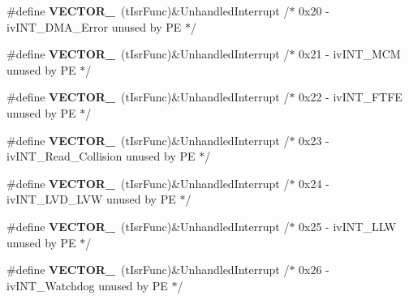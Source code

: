 \begin{DoxyCompactItemize}
\item 
\#define {\bfseries V\+E\+C\+T\+O\+R\+\_}~(t\+Isr\+Func)\&Unhandled\+Interrupt         /$\ast$ 0x20 -\/    iv\+I\+N\+T\+\_\+\+D\+M\+A\+\_\+\+Error                unused by P\+E $\ast$/\hypertarget{group___vectors___config__module_ga0269121a1928c479e78a0cf8389a8606}{}\label{group___vectors___config__module_ga0269121a1928c479e78a0cf8389a8606}

\item 
\#define {\bfseries V\+E\+C\+T\+O\+R\+\_}~(t\+Isr\+Func)\&Unhandled\+Interrupt         /$\ast$ 0x21 -\/    iv\+I\+N\+T\+\_\+\+M\+C\+M                      unused by P\+E $\ast$/\hypertarget{group___vectors___config__module_gab9aad8beb1c40b9a86b606432ae918df}{}\label{group___vectors___config__module_gab9aad8beb1c40b9a86b606432ae918df}

\item 
\#define {\bfseries V\+E\+C\+T\+O\+R\+\_}~(t\+Isr\+Func)\&Unhandled\+Interrupt         /$\ast$ 0x22 -\/    iv\+I\+N\+T\+\_\+\+F\+T\+F\+E                     unused by P\+E $\ast$/\hypertarget{group___vectors___config__module_gad92377670554ff5df8f4b91977b0b195}{}\label{group___vectors___config__module_gad92377670554ff5df8f4b91977b0b195}

\item 
\#define {\bfseries V\+E\+C\+T\+O\+R\+\_}~(t\+Isr\+Func)\&Unhandled\+Interrupt         /$\ast$ 0x23 -\/    iv\+I\+N\+T\+\_\+\+Read\+\_\+\+Collision           unused by P\+E $\ast$/\hypertarget{group___vectors___config__module_gad764304b4aca3a0d8c2d88fcb6fec003}{}\label{group___vectors___config__module_gad764304b4aca3a0d8c2d88fcb6fec003}

\item 
\#define {\bfseries V\+E\+C\+T\+O\+R\+\_}~(t\+Isr\+Func)\&Unhandled\+Interrupt         /$\ast$ 0x24 -\/    iv\+I\+N\+T\+\_\+\+L\+V\+D\+\_\+\+L\+V\+W                  unused by P\+E $\ast$/\hypertarget{group___vectors___config__module_ga136b27607e165d1c8f943c43204f548e}{}\label{group___vectors___config__module_ga136b27607e165d1c8f943c43204f548e}

\item 
\#define {\bfseries V\+E\+C\+T\+O\+R\+\_}~(t\+Isr\+Func)\&Unhandled\+Interrupt         /$\ast$ 0x25 -\/    iv\+I\+N\+T\+\_\+\+L\+L\+W                      unused by P\+E $\ast$/\hypertarget{group___vectors___config__module_ga694dcf9993014544e98daa3486a1dee8}{}\label{group___vectors___config__module_ga694dcf9993014544e98daa3486a1dee8}

\item 
\#define {\bfseries V\+E\+C\+T\+O\+R\+\_}~(t\+Isr\+Func)\&Unhandled\+Interrupt         /$\ast$ 0x26 -\/    iv\+I\+N\+T\+\_\+\+Watchdog                 unused by P\+E $\ast$/\hypertarget{group___vectors___config__module_ga6759d235ac8ab259770668b95dd5b5c8}{}\label{group___vectors___config__module_ga6759d235ac8ab259770668b95dd5b5c8}


\end{DoxyCompactItemize}
